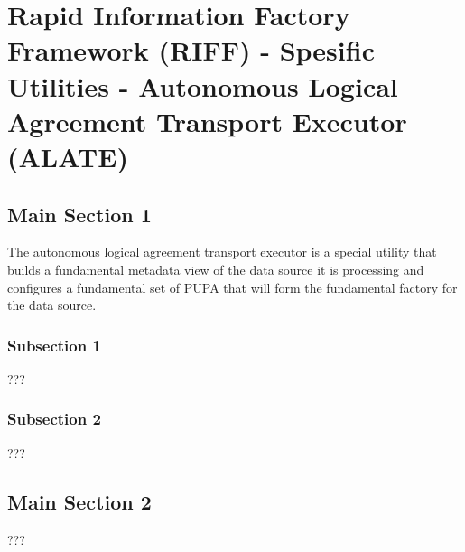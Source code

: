 
\chapter{Rapid Information Factory Framework (RIFF) - Spesific Utilities - Autonomous Logical Agreement Transport Executor (ALATE)} %

\label{Chapter41} %



\section{Main Section 1}

The autonomous logical agreement transport executor is a special utility that builds a fundamental metadata view of the data source it is processing and configures a fundamental set of PUPA that will form the fundamental factory for the data source.

\subsection{Subsection 1}

???


\subsection{Subsection 2}

???


\section{Main Section 2}

???
